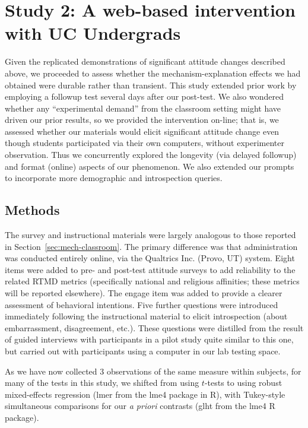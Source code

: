 \section{Study 2: A web-based intervention with UC Undergrads}

Given the replicated demonstrations of significant attitude changes described
above, we proceeded to assess whether the mechanism-explanation effects we had
obtained were durable rather than transient. This study extended prior work by
employing a followup test several days after our post-test. We also wondered
whether any ``experimental demand'' from the classroom setting might have driven
our prior results, so we provided the intervention on-line; that is, we assessed
whether our materials would elicit significant attitude change even though
students participated via their own computers, without experimenter observation.
Thus we concurrently explored the longevity (via delayed followup) and format
(online) aspects of our phenomenon. We also extended our prompts to incorporate
more demographic and introspection queries.

\subsection{Methods}

The survey and instructional materials were largely analogous to those reported
in Section~\ref{sec:mech-classroom}. The primary difference was that
administration was conducted entirely online, via the Qualtrics Inc. (Provo, UT)
system. Eight items were added to pre- and post-test attitude surveys to add
reliability to the related RTMD metrics (specifically national and religious
affinities; these metrics will be reported elsewhere). The \textsf{engage} item
was added to provide a clearer assessment of behavioral intentions. Five further
questions were introduced immediately following the instructional material to
elicit introspection (about embarrassment, disagreement, etc.). These questions
were distilled from the result of guided interviews with participants in a pilot
study quite similar to this one, but carried out with participants using a
computer in our lab testing space.

As we have now collected 3 observations of the same measure within subjects, for
many of the tests in this study, we shifted from using $t$-tests to using robust
mixed-effects regression (\textsf{lmer} from the \textsf{lme4} package in R),
with Tukey-style simultaneous comparisons for our \emph{a priori} contrasts
(\textsf{glht} from the \textsf{lme4} R package).

